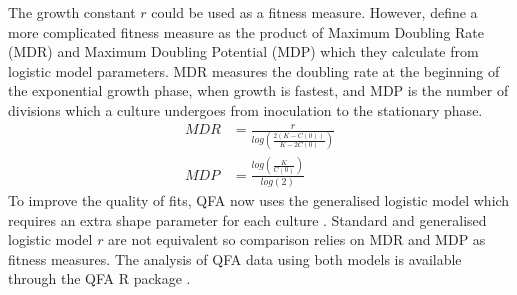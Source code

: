 The growth constant \(r\) could be used as a fitness measure. However,
\citet{Addinall2011} define a more complicated fitness measure as the
product of Maximum Doubling Rate (MDR) and Maximum Doubling Potential
(MDP) which they calculate from logistic model parameters. MDR measures
the doubling rate at the beginning of the exponential growth phase,
when growth is fastest, and MDP is the number of divisions which a
culture undergoes from inoculation to the stationary phase.
%
\begin{subequations}
  \label{eq:MDR_MDP}
    \begin{align}
      MDR &= \frac{r}{log\left(\frac{2(K-C(0))}{K-2C(0)}\right)}\\
      MDP &= \frac{log\left(\frac{K}{C(0)}\right)}{log(2)}
    \end{align}
\end{subequations}
%
To improve the quality of fits, QFA now uses the generalised logistic
model which requires an extra shape parameter for each culture
\citep{Banks2012}. Standard and generalised logistic model \(r\) are
not equivalent so comparison relies on MDR and MDP as fitness
measures. The analysis of QFA data using both models is available
through the QFA R package \citep{qfa2016}.



